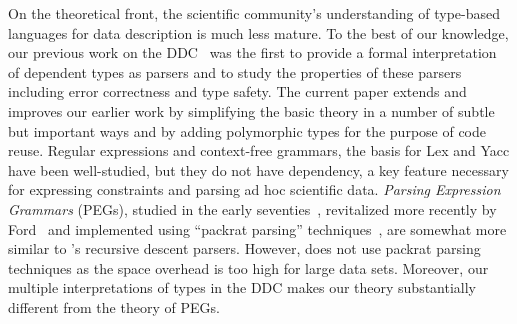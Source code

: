 On the theoretical front, the scientific community's understanding of
type-based languages for data description is much less mature.  To the
best of our knowledge, our previous work on the DDC~\cite{fisher+:next700ddl} 
was the first to provide a
formal interpretation of dependent types as parsers and to study the
properties of these parsers including error correctness and type
safety.  The current paper extends and improves our earlier work 
by simplifying the basic theory in a number of subtle but important ways
and by adding polymorphic types for the purpose of code reuse.
Regular expressions and context-free grammars, the basis for
Lex and Yacc have been well-studied, but they do not have dependency,
a key feature necessary for expressing constraints and parsing ad hoc
scientific data.  {\em Parsing Expression Grammars} (PEGs), studied in
the early seventies~\cite{birman+:parsing}, revitalized more recently
by Ford~\cite{ford:pegs} and implemented using ``packrat parsing''
techniques~\cite{ford:packrat,grimm:packrat}, are somewhat more
similar to \padsml{}'s recursive descent parsers. However, \padsml{} does not use
packrat parsing techniques as the space overhead is too high for large
data sets.  Moreover, our multiple interpretations of types
in the DDC makes our theory substantially different from the theory of
PEGs.





